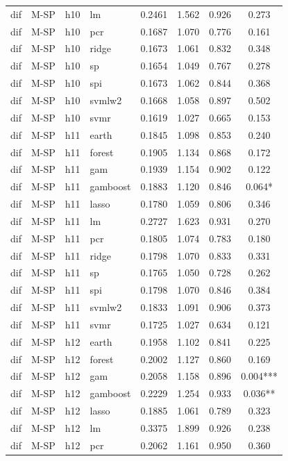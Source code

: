 \begin{ThreePartTable}
\begin{longtable}[t]{llclcccc}
dif & M-SP & h10 & lm & 0.2461 & 1.562 & 0.926 & 0.273\\
dif & M-SP & h10 & pcr & 0.1687 & 1.070 & 0.776 & 0.161\\
dif & M-SP & h10 & ridge & 0.1673 & 1.061 & 0.832 & 0.348\\
dif & M-SP & h10 & sp & 0.1654 & 1.049 & 0.767 & 0.278\\
dif & M-SP & h10 & spi & 0.1673 & 1.062 & 0.844 & 0.368\\
dif & M-SP & h10 & svmlw2 & 0.1668 & 1.058 & 0.897 & 0.502\\
dif & M-SP & h10 & svmr & 0.1619 & 1.027 & 0.665 & 0.153\\
\addlinespace
dif & M-SP & h11 & earth & 0.1845 & 1.098 & 0.853 & 0.240\\
dif & M-SP & h11 & forest & 0.1905 & 1.134 & 0.868 & 0.172\\
dif & M-SP & h11 & gam & 0.1939 & 1.154 & 0.902 & 0.122\\
dif & M-SP & h11 & gamboost & 0.1883 & 1.120 & 0.846 & 0.064*\\
dif & M-SP & h11 & lasso & 0.1780 & 1.059 & 0.806 & 0.346\\
dif & M-SP & h11 & lm & 0.2727 & 1.623 & 0.931 & 0.270\\
dif & M-SP & h11 & pcr & 0.1805 & 1.074 & 0.783 & 0.180\\
dif & M-SP & h11 & ridge & 0.1798 & 1.070 & 0.833 & 0.331\\
dif & M-SP & h11 & sp & 0.1765 & 1.050 & 0.728 & 0.262\\
dif & M-SP & h11 & spi & 0.1798 & 1.070 & 0.846 & 0.384\\
dif & M-SP & h11 & svmlw2 & 0.1833 & 1.091 & 0.906 & 0.373\\
dif & M-SP & h11 & svmr & 0.1725 & 1.027 & 0.634 & 0.121\\
\addlinespace
dif & M-SP & h12 & earth & 0.1958 & 1.102 & 0.841 & 0.225\\
dif & M-SP & h12 & forest & 0.2002 & 1.127 & 0.860 & 0.169\\
dif & M-SP & h12 & gam & 0.2058 & 1.158 & 0.896 & 0.004***\\
dif & M-SP & h12 & gamboost & 0.2229 & 1.254 & 0.933 & 0.036**\\
dif & M-SP & h12 & lasso & 0.1885 & 1.061 & 0.789 & 0.323\\
dif & M-SP & h12 & lm & 0.3375 & 1.899 & 0.926 & 0.238\\
dif & M-SP & h12 & pcr & 0.2062 & 1.161 & 0.950 & 0.360\\

\end{longtable}
\end{ThreePartTable}
